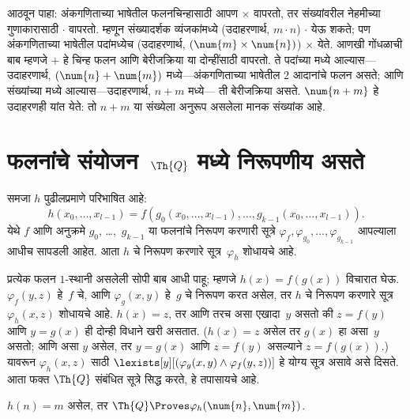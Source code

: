 \begin{explain}
  आठवून पाहा: अंकगणिताच्या भाषेतील फलनचिन्हासाठी आपण $\times$
  वापरतो, तर संख्यांवरील नेहमीच्या गुणाकारासाठी $\cdot$ वापरतो.
  म्हणून संख्यादर्शक व्यंजकांमध्ये (उदाहरणार्थ, $m \cdot n$)
  $\cdot$ येऊ शकते; पण अंकगणिताच्या भाषेतील पदांमध्येच
  (उदाहरणार्थ, $(\num{m} \times
  \num{n})$) $\times$ येते. आणखी गोंधळाची बाब म्हणजे $+$
  हे चिन्ह फलन आणि बेरीजक्रिया या दोन्हींसाठी वापरतो.
  ते पदांच्या मध्ये आल्यास---उदाहरणार्थ, $(\num{n} + \num{m})$
  मध्ये---अंकगणिताच्या भाषेतील $2$ आदानांचे फलन असते;
  आणि संख्यांच्या मध्ये आल्यास---उदाहरणार्थ, $n+m$ मध्ये---
  ती बेरीजक्रिया असते. $\num{n+m}$ हे उदाहरणही यांत येते:
  तो $n+m$ या संख्येला अनुरूप असलेला मानक संख्यांक आहे.
\end{explain}











\section{फलनांचे संयोजन~$\Th{Q}$ मध्ये निरूपणीय असते}\label{inc:req:cmp:sec}

समजा $h$ पुढीलप्रमाणे परिभाषित आहे:
\[h(x_0,\dots,x_{l-1}) = f(g_0(x_0,\dots,x_{l-1}), \dots,
g_{k-1}(x_0,\dots,x_{l-1})).
\]
येथे $f$ आणि अनुक्रमे $g_0$,
\dots,~$g_{k-1}$ या फलनांचे निरूपण करणारी
सूत्रे $\varphi_f, \varphi_{g_0}, \dots,
\varphi_{g_{k-1}}$ आपल्याला आधीच सापडली आहेत. आता $h$ चे
निरूपण करणारे सूत्र~$\varphi_h$ शोधायचे आहे.

प्रत्येक फलन $1$-स्थानी असलेली सोपी बाब आधी पाहू; म्हणजे
$h(x) = f(g(x))$ विचारात घेऊ. $\varphi_f(y, z)$ हे~$f$ चे,
आणि $\varphi_g(x, y)$ हे~$g$ चे निरूपण करत असेल, तर $h$ चे
निरूपण करणारे सूत्र~$\varphi_h(x, z)$ शोधायचे आहे.
$h(x) = z$, तर आणि तरच असा एखादा~$y$ असतो की
$z = f(y)$ आणि $y = g(x)$ ही दोन्ही विधाने खरी असतात.
($h(x) = z$ असेल तर $g(x)$ हा असा~$y$ असतो; आणि असा
$y$ असेल, तर $y = g(x)$ आणि $z = f(y)$ असल्याने
$z = f(g(x))$.) यावरून $\varphi_h(x, z)$ साठी
$\lexists[y][(\varphi_g(x, y) \land \varphi_f(y,
  z))]$ हे योग्य सूत्र असावे असे दिसते. आता फक्त
$\Th{Q}$ संबंधित सूत्रे सिद्ध करते, हे तपासायचे आहे.

\begin{prop}
\label{inc:req:cmp:prop:rep1}
$h(n) = m$ असेल, तर $\Th{Q} \Proves \varphi_h(\num{n}, \num{m})$.
\end{prop}

